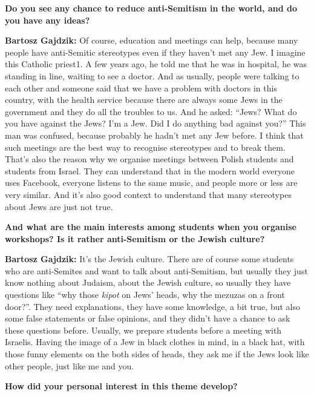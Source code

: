 \textbf{Do you see any chance to reduce anti-Semitism in the world, and do you have any ideas?} 

\textbf{Bartosz Gajdzik:} Of course, education and meetings can help, because many people have anti-Semitic stereotypes even if they haven’t met any Jew. I imagine this Catholic priest1. A few years ago, he told me that he was in hospital, he was standing in line, waiting to see a doctor. And as usually, people were talking to each other and someone said that we have a problem with doctors in this country, with the health service because there are always some Jews in the government and they do all the troubles to us. And he asked: ``Jews? What do you have against the Jews? I’m a Jew. Did I do anything bad against you?'' This man was confused, because probably he hadn’t met any Jew before. I think that such meetings are the best way to recognise stereotypes and to break them. That’s also the reason why we organise meetings between Polish students and students from Israel. They can understand that in the modern world everyone uses Facebook, everyone listens to the same music, and people more or less are very similar. And it’s also good context to understand that many stereotypes about Jews are just not true.  

\textbf{And what are the main interests among students when you organise workshops? Is it rather anti-Semitism or the Jewish culture?}   

\textbf{Bartosz Gajdzik:} It’s the Jewish culture. There are of course some students who are anti-Semites and want to talk about anti-Semitism, but usually they just know nothing about Judaism, about the Jewish culture, so usually they have questions like ``why those \textit{kipot} on Jews’ heads, why the mezuzas on a front door?''. They need explanations, they have some knowledge, a bit true, but also some false statements or false opinions, and they didn’t have a chance to ask these questions before. Usually, we prepare students before a meeting with Israelis. Having the image of a Jew in black clothes in mind, in a black hat, with those funny elements on the both sides of heads, they ask me if the Jews look like other people, just like me and you.  

\textbf{How did your personal interest in this theme develop?} 

